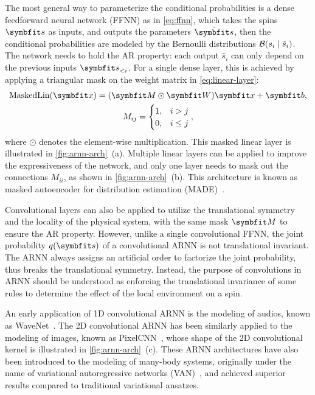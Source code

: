The most general way to parameterize the conditional probabilities is a dense feedforward neural network (FFNN) as in \cref{eq:ffnn}, which takes the spins $\vs$ as inputs, and outputs the parameters $\hat{\vs}$, then the conditional probabilities are modeled by the Bernoulli distributions $\mathcal{B}(s_i \mid \hat{s}_i)$. The network needs to hold the AR property: each output $\hat{s}_i$ can only depend on the previous inputs $\vs_{< i}$. For a single dense layer, this is achieved by applying a triangular mask on the weight matrix in \cref{eq:linear-layer}:
\begin{gather}
\text{MaskedLin}(\vx) = (\mM \odot \mW) \vx + \mb, \\
M_{i j} = \begin{cases}
1, & i > j \\
0, & i \le j
\end{cases},
\end{gather}
where $\odot$ denotes the element-wise multiplication. This masked linear layer is illustrated in \cref{fig:arnn-arch}~(a). Multiple linear layers can be applied to improve the expressiveness of the network, and only one layer needs to mask out the connections $M_{i i}$, as shown in \cref{fig:arnn-arch}~(b). This architecture is known as masked autoencoder for distribution estimation (MADE)~\cite{germain2015made}.

Convolutional layers can also be applied to utilize the translational symmetry and the locality of the physical system, with the same mask $\mM$ to ensure the AR property. However, unlike a single convolutional FFNN, the joint probability $q(\vs)$ of a convolutional ARNN is not translational invariant. The ARNN always assigns an artificial order to factorize the joint probability, thus breaks the translational symmetry. Instead, the purpose of convolutions in ARNN should be understood as enforcing the translational invariance of some rules to determine the effect of the local environment on a spin.

An early application of 1D convolutional ARNN is the modeling of audios, known as WaveNet~\cite{oord2016wavenet}. The 2D convolutional ARNN has been similarly applied to the modeling of images, known as PixelCNN~\cite{oord2016pixel}, whose shape of the 2D convolutional kernel is illustrated in \cref{fig:arnn-arch}~(c). These ARNN architectures have also been introduced to the modeling of many-body systems, originally under the name of variational autoregressive networks (VAN)~\cite{wu2019solving}, and achieved superior results compared to traditional variational ansatzes.

